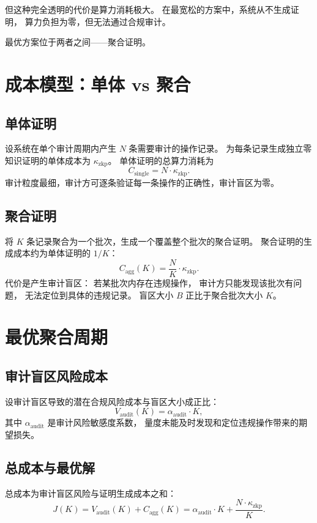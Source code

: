 \documentclass[11pt,a4paper]{article}
\begin{document}
但这种完全透明的代价是算力消耗极大。
在最宽松的方案中，系统从不生成证明，
算力负担为零，但无法通过合规审计。

最优方案位于两者之间——聚合证明。

\section{成本模型：单体 vs 聚合}

\subsection{单体证明}

设系统在单个审计周期内产生 \(N\) 条需要审计的操作记录。
为每条记录生成独立零知识证明的单体成本为 \(\kappa_{\text{zkp}}\)。
单体证明的总算力消耗为
\[
C_{\text{single}} = N \cdot \kappa_{\text{zkp}}.
\]
审计粒度最细，审计方可逐条验证每一条操作的正确性，审计盲区为零。

\subsection{聚合证明}

将 \(K\) 条记录聚合为一个批次，生成一个覆盖整个批次的聚合证明。
聚合证明的生成成本约为单体证明的 \(1/K\)：
\[
C_{\text{agg}}(K) = \frac{N}{K} \cdot \kappa_{\text{zkp}}.
\]
代价是产生审计盲区：
若某批次内存在违规操作，
审计方只能发现该批次有问题，
无法定位到具体的违规记录。
盲区大小 \(B\) 正比于聚合批次大小 \(K\)。

\section{最优聚合周期}

\subsection{审计盲区风险成本}

设审计盲区导致的潜在合规风险成本与盲区大小成正比：
\[
V_{\text{audit}}(K) = \alpha_{\text{audit}} \cdot K,
\]
其中 \(\alpha_{\text{audit}}\) 是审计风险敏感度系数，
量度未能及时发现和定位违规操作带来的期望损失。

\subsection{总成本与最优解}

总成本为审计盲区风险与证明生成成本之和：
\[
J(K) = V_{\text{audit}}(K) + C_{\text{agg}}(K) = \alpha_{\text{audit}} \cdot K + \frac{N \cdot \kappa_{\text{zkp}}}{K}.
\]
\end{document}
